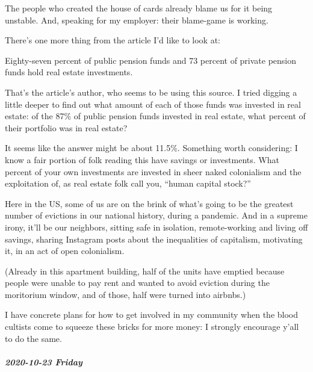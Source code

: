 \documentclass[11pt]{article}
\begin{document}
\begin{itemize}
The people who created the house of cards already blame us for it being unstable. And, speaking for my employer: their blame-game is working.

There’s one more thing from the article I’d like to look at:

Eighty-seven percent of public pension funds and 73 percent of private pension funds hold real estate investments.

That’s the article’s author, who seems to be using this source. I tried digging a little deeper to find out what amount of each of those funds was invested in real estate: of the 87\% of public pension funds invested in real estate, what percent of their portfolio was in real estate?

It seems like the answer might be about 11.5\%. Something worth considering: I know a fair portion of folk reading this have savings or investments. What percent of your own investments are invested in sheer naked colonialism and the exploitation of, as real estate folk call you, “human capital stock?”

Here in the US, some of us are on the brink of what’s going to be the greatest number of evictions in our national history, during a pandemic. And in a supreme irony, it’ll be our neighbors, sitting safe in isolation, remote-working and living off savings, sharing Instagram posts about the inequalities of capitalism, motivating it, in an act of open colonialism.

(Already in this apartment building, half of the units have emptied because people were unable to pay rent and wanted to avoid eviction during the moritorium window, and of those, half were turned into airbnbs.)

I have concrete plans for how to get involved in my community when the blood cultists come to squeeze these bricks for more money: I strongly encourage y’all to do the same.
\end{itemize}
\subparagraph*{2020-10-23 Friday}
\label{sec:org28c0d03}
\end{document}
